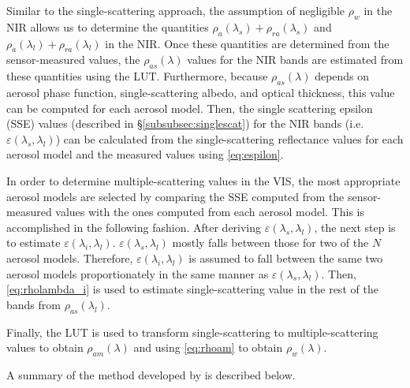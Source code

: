 Similar to the single-scattering approach, the assumption of negligible $\rho_w$ in the NIR allows us to determine the quantities $\rho_a(\lambda_s)+\rho_{ra}(\lambda_s)$ and $\rho_a(\lambda_l)+\rho_{ra}(\lambda_l)$ in the NIR. Once these quantities are determined from the sensor-measured values, the $\rho_{as}(\lambda)$ values for the NIR bands are estimated from these quantities using the LUT. Furthermore, because $\rho_{as}(\lambda)$ depends on aerosol phase function, single-scattering albedo, and optical thickness, this value can be computed for each aerosol model. Then, the single scattering epsilon (SSE)  values (described in \S\ref{subsubsec:singlescat}) for the NIR bands (i.e. $\varepsilon(\lambda_s,\lambda_l)$) can be calculated from the single-scattering reflectance values for each aerosol model and the measured values using \autoref{eq:espilon}. 

In order to determine multiple-scattering values in the VIS, the most appropriate aerosol models are selected by comparing the SSE computed from the sensor-measured values with the ones computed from each aerosol model. This is accomplished in the following fashion. After deriving $\varepsilon(\lambda_s,\lambda_l)$, the next step is to estimate $\varepsilon(\lambda_i,\lambda_l)$. $\varepsilon(\lambda_s,\lambda_l)$ mostly falls between those for two of the $N$ aerosol models. Therefore, $\varepsilon(\lambda_i,\lambda_l)$ is assumed to fall between the same two aerosol models proportionately in the same manner as $\varepsilon(\lambda_s,\lambda_l)$. Then, \autoref{eq:rholambda_i} is used to estimate single-scattering value in the rest of the bands from $\rho_{as}(\lambda_l)$. 

Finally, the LUT is used to transform single-scattering to multiple-scattering values to obtain $\rho_{am}(\lambda)$ and using \autoref{eq:rhoam} to obtain $\rho_w(\lambda)$. 


A summary of the method developed by \cite{Gordon:1994} is described below.

